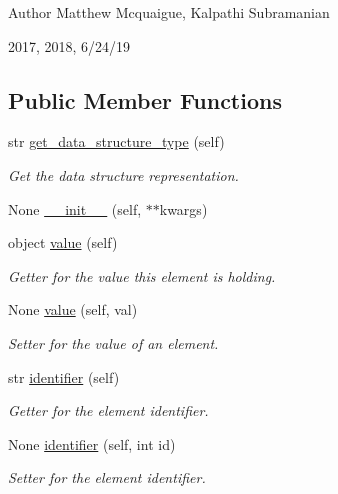\begin{DoxyAuthor}{Author}
Matthew Mcquaigue, Kalpathi Subramanian
\end{DoxyAuthor}
2017, 2018, 6/24/19 \subsection*{Public Member Functions}
\begin{DoxyCompactItemize}
\item 
str \mbox{\hyperlink{classbridges_1_1element_1_1_element_ada235252964d163ab1df8a9609b2af5b}{get\+\_\+data\+\_\+structure\+\_\+type}} (self)
\begin{DoxyCompactList}\small\item\em Get the data structure representation. \end{DoxyCompactList}\item 
None \mbox{\hyperlink{classbridges_1_1element_1_1_element_a59432b0af6594a2c8b57602eb8fc4906}{\+\_\+\+\_\+init\+\_\+\+\_\+}} (self, $\ast$$\ast$kwargs)
\item 
object \mbox{\hyperlink{classbridges_1_1element_1_1_element_ad18e8738e025d7af322144aecbec1629}{value}} (self)
\begin{DoxyCompactList}\small\item\em Getter for the value this element is holding. \end{DoxyCompactList}\item 
None \mbox{\hyperlink{classbridges_1_1element_1_1_element_ab2b6e30e1c3443ddde043b919e1d7ef5}{value}} (self, val)
\begin{DoxyCompactList}\small\item\em Setter for the value of an element. \end{DoxyCompactList}\item 
str \mbox{\hyperlink{classbridges_1_1element_1_1_element_a31cdf36f75fe34aebec85b95025cc732}{identifier}} (self)
\begin{DoxyCompactList}\small\item\em Getter for the element identifier. \end{DoxyCompactList}\item 
None \mbox{\hyperlink{classbridges_1_1element_1_1_element_acdba2c20daeb16c7e6ce1f4d7192e782}{identifier}} (self, int id)
\begin{DoxyCompactList}\small\item\em Setter for the element identifier. \end{DoxyCompactList}\item 
$$
\end{DoxyCompactItemize}
